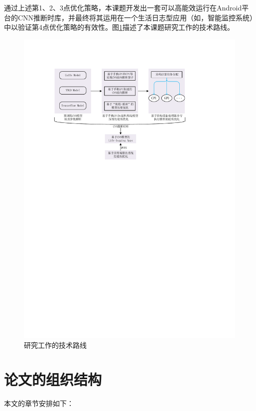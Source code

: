 通过上述第1、2、3点优化策略，本课题开发出一套可以高能效运行在Android平台的CNN推断时库，并最终将其运用在一个生活日志型应用（如，智能监控系统）中以验证第4点优化策略的有效性。图\ref{figure:figurework}描述了本课题研究工作的技术路线。

\begin{figure}[htbp]
    \begin{center}
    \includegraphics[width=1.0\textwidth]{figures/work.pdf}
    \end{center}
    \caption{研究工作的技术路线}\label{figure:figurework}
\end{figure}

\section{论文的组织结构}

本文的章节安排如下：

